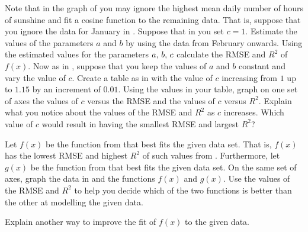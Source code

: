 \documentclass[a4paper,oneside,12pt]{article}
\begin{document}
\begin{problem}
\begin{packedenum}
  \item\label{subprob:trigonometric:mean_daily_sunshine_remove_highest}
    Note that in the graph
    of  you may
    ignore the highest mean daily number of hours of sunshine and fit
    a cosine function to the remaining data.  That is, suppose that
    you ignore the data for January in
    .  Suppose that in
     you set
    $c = 1$.  Estimate the values of the parameters $a$ and $b$ by
    using the data from February onwards.  Using the estimated values
    for the parameters ${a},\, {b},\, {c}$ calculate the RMSE and $R^2$
    of $f(x)$.  Now as
    in ,
    suppose that you keep the values of $a$ and $b$ constant and vary
    the value of $c$.  Create a table as
    in  with
    the value of $c$ increasing from $1$ up to $1.15$ by an increment
    of $0.01$.  Using the values in your table, graph on one set of
    axes the values of $c$ versus the RMSE and the values of $c$
    versus $R^2$.  Explain what you notice about the values of the
    RMSE and $R^2$ as $c$ increases.  Which value of $c$ would result
    in  having the
    smallest RMSE and largest $R^2$?

  \item\label{subprob:trigonometric:mean_daily_sunshine_best_model}
    Let $f(x)$ be the function
    from 
    that best fits the given data set.  That is, $f(x)$ has the lowest
    RMSE and highest $R^2$ of such values
    from .
    Furthermore, let $g(x)$ be the function
    from 
    that best fits the given data set.  On the same set of axes, graph
    the data in  and the
    functions $f(x)$ and $g(x)$.  Use the values of the RMSE and $R^2$
    to help you decide which of the two functions is better than the
    other at modelling the given data.

  \item\label{subprob:trigonometric:mean_daily_sunshine_other_model}
    {\color{red}
      Explain another way to improve the fit of $f(x)$ to the given
      data.
    }
  \end{packedenum}
\end{problem}
\end{document}
